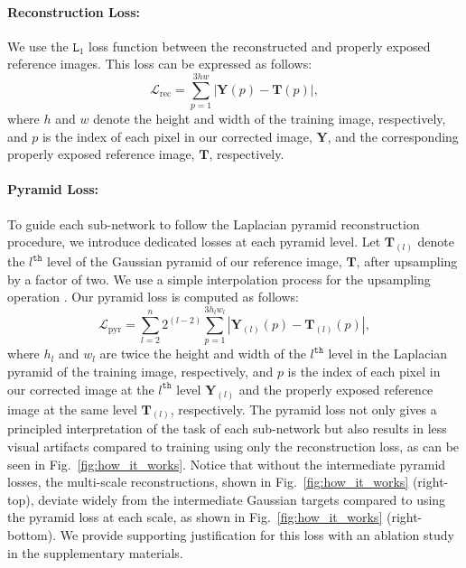 \documentclass[final]{cvpr}
\begin{document}
\paragraph{Reconstruction Loss:}
We use the $\texttt{L}_1$ loss function between the reconstructed and properly exposed reference images. This loss can be expressed as follows:
\begin{equation}
\label{eq:wo_pyramid_loss}
\mathcal{L}_{\text{rec}} = \sum_{p=1}^{3hw} \left|\mathbf{Y}(p) - \mathbf{T}(p)\right|,
\end{equation}
where $h$ and $w$ denote the height and width of the training image, respectively, and
$p$ is the index of each pixel in our corrected image, $\mathbf{Y}$, and the
corresponding properly exposed reference image, $\mathbf{T}$, respectively.

\paragraph{Pyramid Loss:}
To guide each sub-network to follow the Laplacian pyramid reconstruction procedure, we introduce dedicated losses at each pyramid level.  Let $\mathbf{T}_{(l)}$ denote the  $l^{\texttt{th}}$ level of the Gaussian pyramid of our reference image, $\mathbf{T}$, after upsampling by a factor of two. We use a simple interpolation process for the upsampling operation \cite{mertens2009exposure}. Our pyramid loss is computed as follows:
\begin{equation}
\label{eq:w_pyramid_loss}
\mathcal{L}_{\text{pyr}} = \sum_{l=2}^{n}2^{(l-2)}\sum_{p=1}^{3h_lw_l} \left|\mathbf{Y}_{(l)}(p) - \mathbf{T}_{(l)}(p)\right|,
\end{equation}
where $h_l$ and $w_l$ are twice the height and width of the $l^{\texttt{th}}$ level in the Laplacian pyramid of the training image, respectively, and
$p$ is the index of each pixel in our corrected image at the $l^{\texttt{th}}$ level $\mathbf{Y}_{(l)}$ and the
properly exposed reference image at the same level $\mathbf{T}_{(l)}$, respectively. The pyramid loss not only gives a principled interpretation of the task of each sub-network but also results in less visual artifacts compared to training using only the reconstruction loss, as can be seen in Fig.~\ref{fig:how_it_works}. Notice that without the intermediate pyramid losses, the multi-scale reconstructions, shown in Fig.\ \ref{fig:how_it_works} (right-top), deviate widely from the intermediate Gaussian targets compared to using the pyramid loss at each scale, as shown in Fig.\ \ref{fig:how_it_works} (right-bottom). We provide supporting justification for this loss with an ablation study in the supplementary materials.
\end{document}
